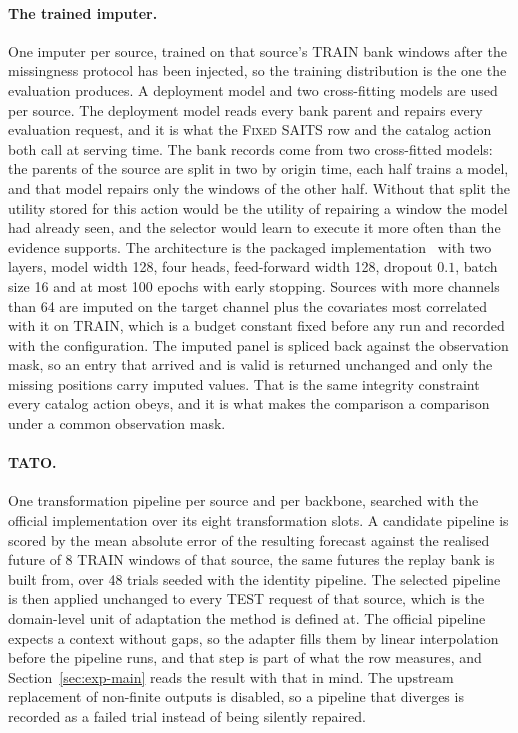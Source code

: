 \documentclass{article}
\begin{document}
\paragraph{The trained imputer.} One imputer per source, trained on that source's TRAIN bank
windows after the missingness protocol has been injected, so the training distribution is the
one the evaluation produces. A deployment model and two cross-fitting models are used per source. The deployment model reads every
bank parent and repairs every evaluation request, and it is what the \textsc{Fixed SAITS} row
and the catalog action both call at serving time. The bank records come from two cross-fitted models: the parents of the source are split in two by origin time, each half trains a model, and
that model repairs only the windows of the other half. Without that split the utility stored
for this action would be the utility of repairing a window the model had already seen, and the
selector would learn to execute it more often than the evidence supports. The architecture is the packaged implementation~\citep{du2023pypots} with
two layers, model width 128, four heads, feed-forward width 128, dropout $0.1$, batch size 16
and at most 100 epochs with early stopping. Sources with more channels than
64 are imputed on the target channel plus the covariates most correlated with it
on TRAIN, which is a budget constant fixed before any run and recorded with the configuration.
The imputed panel is spliced back against the observation mask, so an entry that arrived and is
valid is returned unchanged and only the missing positions carry imputed values. That is the
same integrity constraint every catalog action obeys, and it is what makes the comparison a
comparison under a common observation mask.

\paragraph{TATO.} One transformation pipeline per source and per backbone, searched with the
official implementation over its eight transformation slots. A candidate pipeline is scored by
the mean absolute error of the resulting forecast against the realised future of
8 TRAIN windows of that source, the same futures the replay bank is built from,
over 48 trials seeded with the identity pipeline. The selected pipeline is then
applied unchanged to every TEST request of that source, which is the domain-level unit of
adaptation the method is defined at. The official pipeline expects a context without gaps, so
the adapter fills them by linear interpolation before the pipeline runs, and that step is
part of what the row measures, and Section~\ref{sec:exp-main} reads the result with that in
mind. The upstream replacement of non-finite outputs is disabled, so a pipeline that diverges
is recorded as a failed trial instead of being silently repaired.
\end{document}
